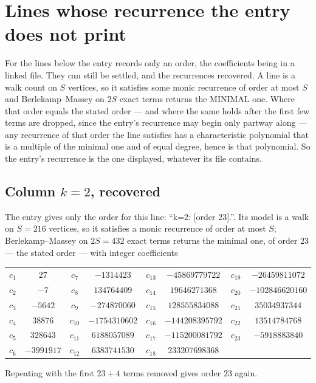 \documentclass[11pt,a4paper]{article}
\theoremstyle{plain}
\theoremstyle{definition}
\begin{document}
\section{Lines whose recurrence the entry does not print}

For the lines below the entry records only an order, the coefficients being in a linked file.
They can still be settled, and the recurrences recovered. A line is a walk count on $S$
vertices, so it satisfies some monic recurrence of order at most $S$ and Berlekamp--Massey on
$2S$ exact terms returns the MINIMAL one. Where that order equals the stated order --- and
where the same holds after the first few terms are dropped, since the entry's recurrence may
begin only partway along --- any recurrence of that order the line satisfies has a
characteristic polynomial that is a multiple of the minimal one and of equal degree, hence is
that polynomial. So the entry's recurrence is the one displayed, whatever its file contains.

\subsection*{Column $k=2$, recovered}
The entry gives only the order for this line: ``k=2: [order 23].''. Its model is a walk on
$S=216$ vertices, so it satisfies a monic recurrence of order at most $S$;
Berlekamp--Massey on $2S=432$ exact terms returns the minimal one, of order
$23$ --- the stated order --- with integer coefficients
\begin{center}\small\begin{tabular}{cccccccc}
$c_{1}$ & $27$ & $c_{7}$ & $-1314423$ & $c_{13}$ & $-45869779722$ & $c_{19}$ & $-26459811072$ \\
$c_{2}$ & $-7$ & $c_{8}$ & $134764409$ & $c_{14}$ & $19646271368$ & $c_{20}$ & $-102846620160$ \\
$c_{3}$ & $-5642$ & $c_{9}$ & $-274870060$ & $c_{15}$ & $128555834088$ & $c_{21}$ & $35034937344$ \\
$c_{4}$ & $38876$ & $c_{10}$ & $-1754310602$ & $c_{16}$ & $-144208395792$ & $c_{22}$ & $13514784768$ \\
$c_{5}$ & $328643$ & $c_{11}$ & $6188057089$ & $c_{17}$ & $-115200081792$ & $c_{23}$ & $-5918883840$ \\
$c_{6}$ & $-3991917$ & $c_{12}$ & $6383741530$ & $c_{18}$ & $233207698368$ &  &  \\
\end{tabular}\end{center}
Repeating with the first $23+4$ terms removed gives order $23$ again.
\end{document}
